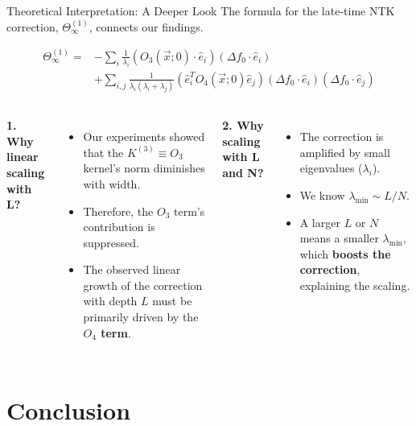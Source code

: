 \documentclass{beamer}
\begin{document}
\begin{frame}{Theoretical Interpretation: A Deeper Look}
The formula for the late-time NTK correction, $\Theta^{(1)}_\infty$, connects our findings.
\begin{theorem}
\begin{align*}
\Theta^{(1)}_\infty = & -\sum_{i}\frac{1}{\lambda_{i}}(O_{3}(\vec{x};0)\cdot\hat{e}_{i})(\Delta f_{0}\cdot\hat{e}_{i}) \\
& + \sum_{i,j}\frac{1}{\lambda_{i}(\lambda_{i}+\lambda_{j})}(\hat{e}_{i}^{T}O_{4}(\vec{x};0)\hat{e}_{j})(\Delta f_{0}\cdot \hat{e}_{i})(\Delta f_{0}\cdot \hat{e}_{j})
\end{align*}
\end{theorem}

\begin{columns}
\textbf{1. Why linear scaling with L?}
\begin{itemize}
    \item Our experiments showed that the $K^{(3)} \equiv O_3$ kernel's norm diminishes with width.
    \item Therefore, the $O_3$ term's contribution is suppressed.
    \item The observed linear growth of the correction with depth $L$ must be primarily driven by the \textbf{$O_4$ term}.
\end{itemize}

\textbf{2. Why scaling with L and N?}
\begin{itemize}
    \item The correction is amplified by small eigenvalues ($\lambda_i$).
    \item We know $\lambda_{\min} \sim L/N$.
    \item A larger $L$ or $N$ means a smaller $\lambda_{\min}$, which \textbf{boosts the correction}, explaining the scaling.
\end{itemize}
\end{columns}

\end{frame}


\section{Conclusion}
\end{document}
